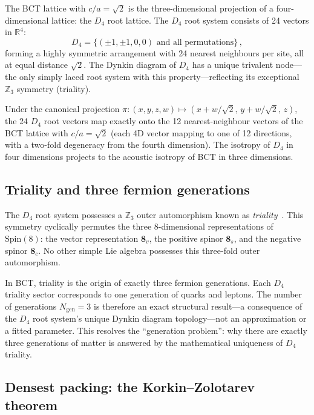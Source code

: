 \documentclass[review,number,sort&compress]{elsarticle}
\newcommand{\Dfour}{D_4}
\begin{document}
The BCT lattice with $c/a = \sqrt{2}$ is the three-dimensional
projection of a four-dimensional lattice: the $\Dfour$ root lattice.
The $\Dfour$ root system consists of 24 vectors in $\mathbb{R}^4$:
\begin{equation}
  \Dfour = \bigl\{(\pm 1, \pm 1, 0, 0)\text{ and all permutations}\bigr\}\,,
  \label{eq:D4_roots}
\end{equation}
forming a highly symmetric arrangement with 24 nearest neighbours per
site, all at equal distance $\sqrt{2}$. The Dynkin diagram of $\Dfour$
has a unique trivalent node---the only simply laced root system with
this property---reflecting its exceptional $\mathbb{Z}_3$ symmetry
(triality).

Under the canonical projection
$\pi: (x, y, z, w) \mapsto (x + w/\sqrt{2},\, y + w/\sqrt{2},\, z)$,
the 24 $\Dfour$ root vectors map exactly onto the 12 nearest-neighbour
vectors of the BCT lattice with $c/a = \sqrt{2}$ (each 4D vector mapping
to one of 12 directions, with a two-fold degeneracy from the fourth
dimension). The isotropy of $\Dfour$ in four dimensions projects to the
acoustic isotropy of BCT in three dimensions.

\subsection{Triality and three fermion generations}

The $\Dfour$ root system possesses a $\mathbb{Z}_3$ outer automorphism
known as \textit{triality}~\cite{ConwaySloane}. This symmetry cyclically
permutes the three 8-dimensional representations of $\mathrm{Spin}(8)$:
the vector representation $\bm{8}_v$, the positive spinor $\bm{8}_s$,
and the negative spinor $\bm{8}_c$. No other simple Lie algebra possesses
this three-fold outer automorphism.

In BCT, triality is the origin of exactly three fermion generations.
Each $\Dfour$ triality sector corresponds to one generation of quarks
and leptons. The number of generations $N_{\mathrm{gen}} = 3$ is therefore
an exact structural result---a consequence of the $\Dfour$ root system's
unique Dynkin diagram topology---not an approximation or a fitted
parameter. This resolves the ``generation problem'': why there are exactly
three generations of matter is answered by the mathematical uniqueness
of $\Dfour$ triality.

\subsection{Densest packing: the Korkin--Zolotarev theorem}
\end{document}
